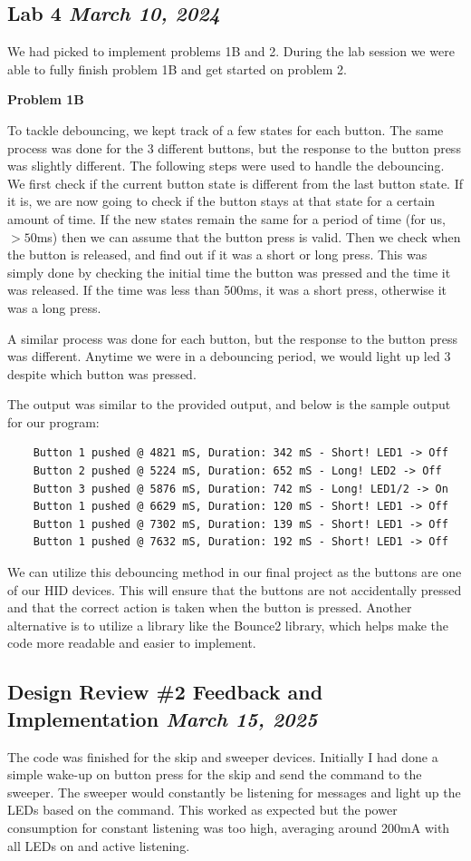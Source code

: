 \documentclass{article}
\newcommand{\logbookentry}[2]{
    \subsection*{#1 \hfill \textit{#2}} 
}
\begin{document}
\logbookentry{Lab 4}{March 10, 2024}
We had picked to implement problems 1B and 2. During the lab session we were able to fully finish problem 1B and get started on problem 2.

\textbf{Problem 1B}

To tackle debouncing, we kept track of a few states for each button. The same process was done for the 3 different buttons, but the response to the button press was slightly different. The following steps were used to handle the debouncing. We first check if the current button state is different from the last button state. If it is, we are now going to check if the button stays at that state for a certain amount of time. If the new states remain the same for a period of time (for us, $> 50$ms) then we can assume that the button press is valid. Then we check when the button is released, and find out if it was a short or long press. This was simply done by checking the initial time the button was pressed and the time it was released. If the time was less than 500ms, it was a short press, otherwise it was a long press.

A similar process was done for each button, but the response to the button press was different. Anytime we were in a debouncing period, we would light up led 3 despite which button was pressed.

The output was similar to the provided output, and below is the sample output for our program:
\begin{verbatim}
    Button 1 pushed @ 4821 mS, Duration: 342 mS - Short! LED1 -> Off
    Button 2 pushed @ 5224 mS, Duration: 652 mS - Long! LED2 -> Off
    Button 3 pushed @ 5876 mS, Duration: 742 mS - Long! LED1/2 -> On
    Button 1 pushed @ 6629 mS, Duration: 120 mS - Short! LED1 -> Off
    Button 1 pushed @ 7302 mS, Duration: 139 mS - Short! LED1 -> Off
    Button 1 pushed @ 7632 mS, Duration: 192 mS - Short! LED1 -> Off  
\end{verbatim}

We can utilize this debouncing method in our final project as the buttons are one of our HID devices. This will ensure that the buttons are not accidentally pressed and that the correct action is taken when the button is pressed. Another alternative is to utilize a library like the Bounce2 library, which helps make the code more readable and easier to implement.


\logbookentry{Design Review \#2 Feedback and Implementation}{March 15, 2025}
The code was finished for the skip and sweeper devices. Initially I had done a simple wake-up on button press for the skip and send the command to the sweeper. The sweeper would constantly be listening for messages and light up the LEDs based on the command. This worked as expected but the power consumption for constant listening was too high, averaging around 200mA with all LEDs on and active listening.
\end{document}
